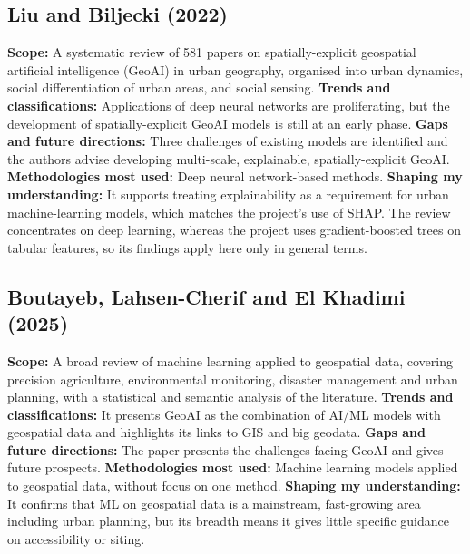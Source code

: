 \documentclass[journal]{IEEEtran}
\begin{document}
\subsection{Liu and Biljecki (2022) \cite{liu2022}}
\textbf{Scope:} A systematic review of 581 papers on spatially-explicit geospatial artificial intelligence (GeoAI) in urban geography, organised into urban dynamics, social differentiation of urban areas, and social sensing.
\textbf{Trends and classifications:} Applications of deep neural networks are proliferating, but the development of spatially-explicit GeoAI models is still at an early phase.
\textbf{Gaps and future directions:} Three challenges of existing models are identified and the authors advise developing multi-scale, explainable, spatially-explicit GeoAI.
\textbf{Methodologies most used:} Deep neural network-based methods.
\textbf{Shaping my understanding:} It supports treating explainability as a requirement for urban machine-learning models, which matches the project's use of SHAP. The review concentrates on deep learning, whereas the project uses gradient-boosted trees on tabular features, so its findings apply here only in general terms.

\subsection{Boutayeb, Lahsen-Cherif and El Khadimi (2025) \cite{boutayeb2025}}
\textbf{Scope:} A broad review of machine learning applied to geospatial data, covering precision agriculture, environmental monitoring, disaster management and urban planning, with a statistical and semantic analysis of the literature.
\textbf{Trends and classifications:} It presents GeoAI as the combination of AI/ML models with geospatial data and highlights its links to GIS and big geodata.
\textbf{Gaps and future directions:} The paper presents the challenges facing GeoAI and gives future prospects.
\textbf{Methodologies most used:} Machine learning models applied to geospatial data, without focus on one method.
\textbf{Shaping my understanding:} It confirms that ML on geospatial data is a mainstream, fast-growing area including urban planning, but its breadth means it gives little specific guidance on accessibility or siting.
\end{document}

